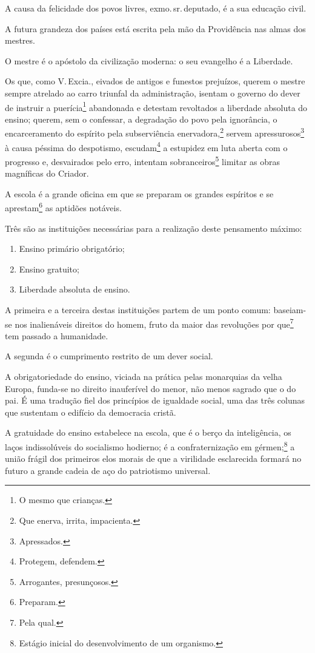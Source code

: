 A causa da felicidade dos povos livres, exmo.\,sr.\,deputado, é a sua
educação civil.

A futura grandeza dos países está escrita pela mão da Providência nas
almas dos mestres.

O mestre é o apóstolo da civilização moderna: o seu evangelho é a
Liberdade.

Os que, como V.\,Excia., eivados de antigos e funestos prejuízos, querem
o mestre sempre atrelado ao carro triunfal da administração, isentam o
governo do dever de instruir a puerícia\footnote{O mesmo que crianças.}
abandonada e detestam revoltados a liberdade absoluta do ensino; querem,
sem o confessar, a degradação do povo pela ignorância, o encarceramento
do espírito pela subserviência enervadora,\footnote{Que enerva, irrita,
  impacienta.} servem apressurosos\footnote{Apressados.} à causa
péssima do despotismo, escudam\footnote{Protegem, defendem.} a
estupidez em luta aberta com o progresso e, desvairados pelo erro,
intentam sobranceiros\footnote{Arrogantes, presunçosos.} limitar as
obras magníficas do Criador.

A escola é a grande oficina em que se preparam os grandes espíritos e se
aprestam\footnote{Preparam.} as aptidões notáveis.

Três são as instituições necessárias para a realização deste pensamento
máximo:

\begin{enumerate}[label=\scshape\roman*.]
\item Ensino primário obrigatório;

\item Ensino gratuito;

\item Liberdade absoluta de ensino.
\end{enumerate}

A primeira e a terceira destas instituições partem de um ponto comum:
baseiam-se nos inalienáveis direitos do homem, fruto da maior das
revoluções por que\footnote{Pela qual.} tem passado a humanidade.

A segunda é o cumprimento restrito de um dever social.

A obrigatoriedade do ensino, viciada na prática pelas monarquias da
velha Europa, funda-se no direito inauferível do menor, não menos
sagrado que o do pai. É uma tradução fiel dos princípios de igualdade
social, uma das três colunas que sustentam o edifício da democracia
cristã.

A gratuidade do ensino estabelece na escola, que é o berço da
inteligência, os laços indissolúveis do socialismo hodierno; é a
confraternização em gérmen;\footnote{Estágio inicial do desenvolvimento
  de um organismo.} a união frágil dos primeiros elos morais de que a
virilidade esclarecida formará no futuro a grande cadeia de aço do
patriotismo universal.

